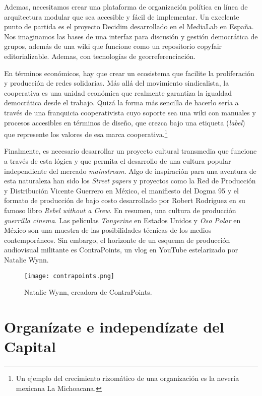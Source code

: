 Ademas, necesitamos crear una plataforma de organización política en línea de arquitectura modular que sea accesible y fácil de implementar. Un excelente punto de partida es el proyecto Decidim desarrollado en el MediaLab en España. Nos imaginamos las bases de una interfaz para discusión y gestión democrática de grupos, además de una wiki que funcione como un repositorio copyfair editorializable. Ademas, con tecnologías de georreferenciación.

En términos económicos, hay que crear un ecosistema que facilite la proliferación y producción de redes solidarias. Más allá del movimiento sindicalista, la cooperativa es una unidad económica que realmente garantiza la igualdad democrática desde el trabajo. Quizá la forma más sencilla de hacerlo sería a través de una franquicia cooperativista cuyo soporte sea una wiki con manuales y procesos accesibles en términos de diseño, que crezca bajo una etiqueta (\emph{label}) que represente los valores de esa marca cooperativa.\footnote{Un ejemplo del crecimiento rizomático de una organización es la nevería mexicana La Michoacana.}

Finalmente, es necesario desarrollar un proyecto cultural transmedia que funcione a través de esta lógica y que permita el desarrollo de una cultura popular independiente del mercado \emph{mainstream}. Algo de inspiración para una aventura de esta naturaleza han sido los \emph{Street papers} y proyectos como la Red de Producción y Distribución Vicente Guerrero en México, el manifiesto del Dogma 95 y el formato de producción de bajo costo desarrollado por Robert Rodriguez en su famoso libro \emph{Rebel without a Crew}. En resumen, una cultura de producción \emph{guerrilla cinema}. Las películas \emph{Tangerine} en Estados Unidos y \emph{Oso Polar} en México son una muestra de las posibilidades técnicas de los medios contemporáneos. Sin embargo, el horizonte de un esquema de producción audiovisual militante es ContraPoints, un vlog en YouTube estelarizado por Natalie Wynn.

\begin{figure}[htbp]
	\centering
	\texttt{[image: contrapoints.png]}
	\caption[Natalie Wynn.]{Natalie Wynn, creadora de ContraPoints.}
	\label{fig:Wynn}
\end{figure}


\section{Organízate e independízate del Capital}
\label{sec:independizate}

